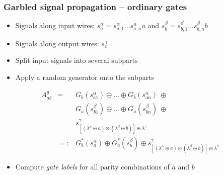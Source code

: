 \documentclass{beamer}
\begin{document}
\begin{frame}
  \frametitle{Garbled signal propagation -- ordinary gates}
  \begin{itemize}
  \item Signals along input wires: $ s_a^\alpha= s^\alpha_{a,1}\dots s^\alpha_{a,n}a$ and $ s_b^\beta= s^\beta_{b,1}\dots s^\beta_{b,n}b$
  \item Signals along output wires: $s_c^\gamma$
  \item Split input signals into several subparts
  \item Apply a random generator onto the subparts
  \end{itemize}
  \begin{eqnarray} \nonumber
    A_{ab}^g &= & G_b(s_{a1}^\alpha)\oplus\dots\oplus G_b(s_{an}^\alpha) 
    \ \oplus \  \\ \nonumber
    & & G_a(s_{b1}^\beta)\oplus\dots\oplus G_a(s_{bn}^\beta)
    \ \oplus \ \\ \nonumber
    & & s_{[(\lambda^\alpha\oplus a)\otimes(\lambda^\beta\oplus b)]\oplus\lambda^\gamma}^\gamma
    \\[.35cm] \label{eqn:gate-labels-definition}
    & =: & G_b^*(s^\alpha_a) \oplus G_a^*(s^\beta_b) \oplus s_{[(\lambda^\alpha\oplus a)\otimes(\lambda^\beta\oplus b)]\oplus\lambda^\gamma}^\gamma
  \end{eqnarray}
  \begin{itemize}
  \item Compute \emph{gate labels} for all parity combinations of $a$ and $b$
  \end{itemize}

\end{frame}
\end{document}
